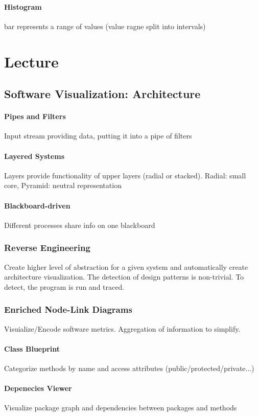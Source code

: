 \documentclass[ngerman]{scrartcl}
\begin{document}
\paragraph{Histogram} bar represents a range of values (value ragne split into intervals)

\section{Lecture}
\subsection{Software Visualization: Architecture}
\paragraph{Pipes and Filters} Input stream providing data, putting it into a pipe of filters
\paragraph{Layered Systems} Layers provide functionality of upper layers (radial or stacked). Radial: small core, Pyramid: neutral representation 
\paragraph{Blackboard-driven} Different processes share info on one blackboard
\subsubsection{Reverse Engineering}
Create higher level of abstraction for a given system and automatically create architecture visualization. The detection of design patterns is non-trivial. To detect, the program is run and traced. 
\subsubsection{Enriched Node-Link Diagrams} 
Visuialize/Encode software metrics. Aggregation of information to simplify.
\paragraph{Class Blueprint}
Categorize methods by name and access attributes (public/protected/private...)
\paragraph{Depenecies Viewer}
Visualize package graph and dependencies between packages and methods
\end{document}
